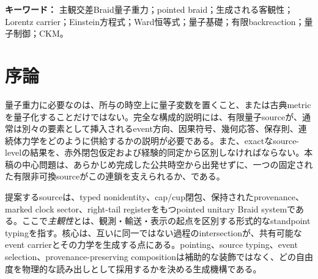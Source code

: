\documentclass[11pt]{article}
\theoremstyle{definition}
\theoremstyle{remark}
\begin{document}
\begin{abstract}
同じ有限sourceは、36次元複素carrier、source-dagger二乗norm確率、observable algebra $M_{18}(\mathbb C)\oplus M_{18}(\mathbb C)$、exactな有限量子制御engineを再構成する。導出されたanomaly-solution groupoidは、anomaly-freeなStandard-Model characterの3 copy、global $\mathbb Z_6$、一つのweak Higgs doublet、charged Yukawa interaction typeを与える。さらに、固定pointed-Braid sourceからCKM modulus matrixを得る計算列を事前登録後に再実行した確認実験はPASSし、frozen outputを残差0で再現した。得られた9要素は凍結したPDG 2024表のすべてで$5\sigma$以内に入り、clock、pointing、pair-starを壊す三つのcontrolはいずれも出力を変えた。この結果は既知導出の登録再現確認であり、新規のblind predictionではない。以上により、量子・幾何・保存則・重力・物質表現を同じsource architectureの出力として結ぶ。これは、公共的で変換を尊重する物理carrierが必ず原初的でなければならない、という客観主義的優先性の普遍命題に対する構成的反証である。
\end{abstract}

\noindent\textbf{キーワード：} 主観交差Braid量子重力；pointed braid；生成される客観性；Lorentz carrier；Einstein方程式；Ward恒等式；量子基礎；有限backreaction；量子制御；CKM。

\section{序論}

量子重力に必要なのは、所与の時空上に量子変数を置くこと、または古典metricを量子化することだけではない。完全な構成的説明には、有限量子sourceが、通常は別々の要素として挿入されるevent方向、因果符号、幾何応答、保存則、連続体力学をどのように供給するかの説明が必要である。また、exactなsource-levelの結果を、赤外閉包仮定および経験的同定から区別しなければならない。本稿の中心問題は、あらかじめ完成した公共時空から出発せずに、一つの固定された有限非可換sourceがこの連鎖を支えられるか、である。

提案するsourceは、typed nonidentity、cap/cup閉包、保持されたprovenance、marked clock sector、right-tail registerをもつpointed unitary Braid systemである。ここで\emph{主観性}とは、観測・輸送・表示の起点を区別する形式的なstandpoint typingを指す。核心は、互いに同一ではない過程のintersectionが、共有可能なevent carrierとその力学を生成する点にある。pointing、source typing、event selection、provenance-preserving compositionは補助的な装飾ではなく、どの自由度を物理的な読み出しとして採用するかを決める生成機構である。
\end{document}
